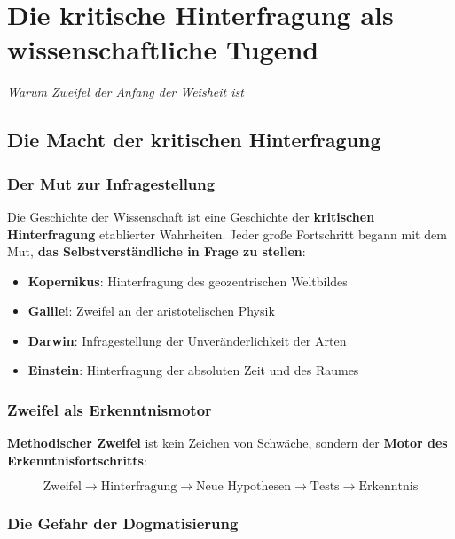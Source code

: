 \documentclass[12pt,a4paper]{report}
\begin{document}
	\chapter{Die kritische Hinterfragung als wissenschaftliche Tugend}
	\textit{Warum Zweifel der Anfang der Weisheit ist}
	
	\section{Die Macht der kritischen Hinterfragung}
	
	\subsection{Der Mut zur Infragestellung}
	
	Die Geschichte der Wissenschaft ist eine Geschichte der \textbf{kritischen Hinterfragung} etablierter Wahrheiten. Jeder große Fortschritt begann mit dem Mut, \textbf{das Selbstverständliche in Frage zu stellen}:
	
	\begin{itemize}
		\item \textbf{Kopernikus}: Hinterfragung des geozentrischen Weltbildes
		\item \textbf{Galilei}: Zweifel an der aristotelischen Physik
		\item \textbf{Darwin}: Infragestellung der Unveränderlichkeit der Arten
		\item \textbf{Einstein}: Hinterfragung der absoluten Zeit und des Raumes
	\end{itemize}
	
	\subsection{Zweifel als Erkenntnismotor}
	
	\textbf{Methodischer Zweifel} ist kein Zeichen von Schwäche, sondern der \textbf{Motor des Erkenntnisfortschritts}:
	
	\begin{equation}
		\text{Zweifel} \to \text{Hinterfragung} \to \text{Neue Hypothesen} \to \text{Tests} \to \text{Erkenntnis}
	\end{equation}
	
	\subsection{Die Gefahr der Dogmatisierung}
	
\end{document}
